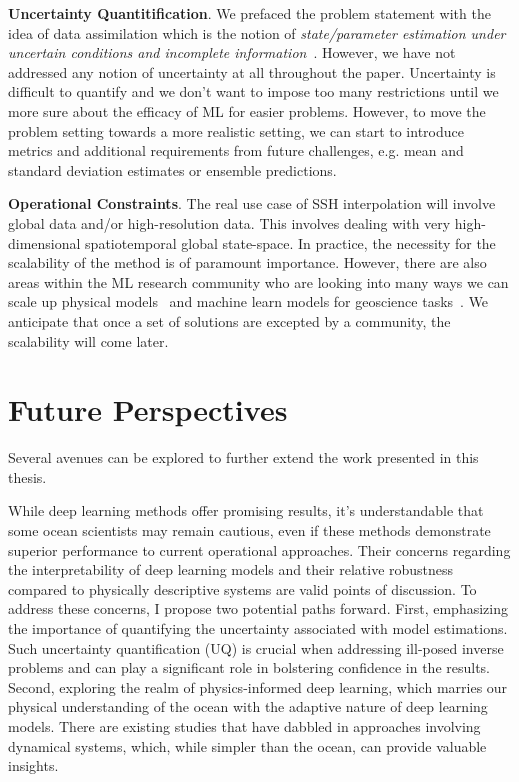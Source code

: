 \begin{bibunit}
\textbf{Uncertainty Quantitification}.
We prefaced the problem statement with the idea of data assimilation which is the notion of \textit{state/parameter estimation under uncertain conditions and incomplete information}~\citep{DAGEOSCIENCE}.
However, we have not addressed any notion of uncertainty at all throughout the paper.
Uncertainty is difficult to quantify and we don't want to impose too many restrictions until we more sure about the efficacy of ML for easier problems.
However, to move the problem setting towards a more realistic setting, we can start to introduce metrics and additional requirements from future challenges, e.g. mean and standard deviation estimates or ensemble predictions.


\textbf{Operational Constraints}.
The real use case of SSH interpolation will involve global data and/or high-resolution data. 
This involves dealing with very high-dimensional spatiotemporal global state-space.
In practice, the necessity for the scalability of the method is of paramount importance.
However, there are also areas within the ML research community who are looking into many ways we can scale up physical models~\citep{VEROS,OCEANANIGANS} and machine learn models for geoscience tasks~\citep{SFNO}.
We anticipate that once a set of solutions are excepted by a community, the scalability will come later.


\section*{Future Perspectives}

Several avenues can be explored to further extend the work presented in this thesis.

While deep learning methods offer promising results, it's understandable that some ocean scientists may remain cautious, even if these methods demonstrate superior performance to current operational approaches. Their concerns regarding the interpretability of deep learning models and their relative robustness compared to physically descriptive systems are valid points of discussion.
To address these concerns, I propose two potential paths forward. First, emphasizing the importance of quantifying the uncertainty associated with model estimations. Such uncertainty quantification (UQ) is crucial when addressing ill-posed inverse problems and can play a significant role in bolstering confidence in the results. Second, exploring the realm of physics-informed deep learning, which marries our physical understanding of the ocean with the adaptive nature of deep learning models. There are existing studies that have dabbled in approaches involving dynamical systems, which, while simpler than the ocean, can provide valuable insights.


\end{bibunit}
